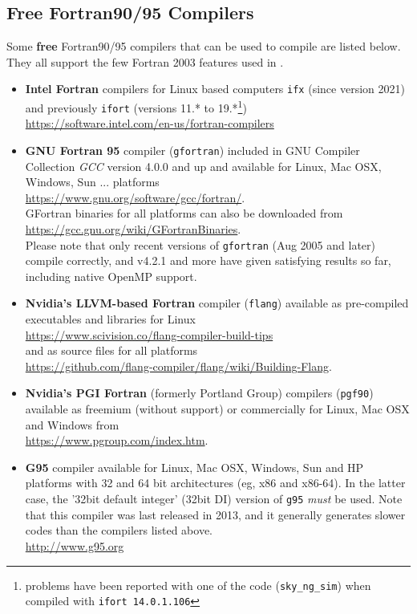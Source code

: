 \documentclass[12pt,twoside]{article}
\begin{document}
\subsection{Free Fortran90/95 Compilers}
\label{sec:freef90compilers}
Some {\bf free} Fortran90/95 compilers that can be used to compile \healpix are listed below.
They all support the few Fortran 2003 features used in \healpixns. 
    \begin{itemize}
%
      \item {\bf Intel Fortran} compilers for Linux based computers \texttt{ifx}
        (since version 2021) and previously
        \texttt{ifort} (versions
11.* to 19.*\footnote{problems have been reported with one of the code (\texttt{sky\_ng\_sim}) when compiled with
\texttt{ifort 14.0.1.106}}) \hfill \\
         \url{https://software.intel.com/en-us/fortran-compilers}
%
      \item {\bf GNU Fortran 95} compiler (\texttt{gfortran}) included in GNU Compiler Collection {\em GCC} version 4.0.0
         and up and available for Linux, Mac OSX, Windows, Sun ... platforms
         \hfill \\
          \url{https://www.gnu.org/software/gcc/fortran/}. \hfill \\
         GFortran binaries for all platforms can also be downloaded from  \hfill \\
          \url{https://gcc.gnu.org/wiki/GFortranBinaries}. \hfill \\
         Please note that only recent versions of \texttt{gfortran} (Aug 2005
         and later) compile \healpix correctly, and v4.2.1 and more have given satisfying
         results so far, including native OpenMP support.
%
     \item {\bf Nvidia's LLVM-based Fortran} compiler (\texttt{flang}) available as pre-compiled executables and libraries for Linux \hfill \\
\url{https://www.scivision.co/flang-compiler-build-tips} \hfill \\
and as source files for all platforms \hfill \\
\url{https://github.com/flang-compiler/flang/wiki/Building-Flang}.
%
     \item {\bf Nvidia's PGI Fortran} (formerly Portland Group) compilers (\texttt{pgf90}) available as freemium (without support) or commercially for Linux, Mac OSX and Windows from 
\hfill \\ \url{https://www.pgroup.com/index.htm}.
%
     \item {\bf G95} compiler available for Linux, Mac OSX, Windows, Sun and HP platforms with 32 and 64 bit architectures (eg, x86 and x86-64). In the latter case, the '32bit default integer' (32bit DI) version of \texttt{g95} {\em must} be used. Note that this compiler was last released in 2013, and it generally generates slower codes 
than the compilers listed above.
         \hfill \\ \url{http://www.g95.org}
    \end{itemize}
\end{document}
